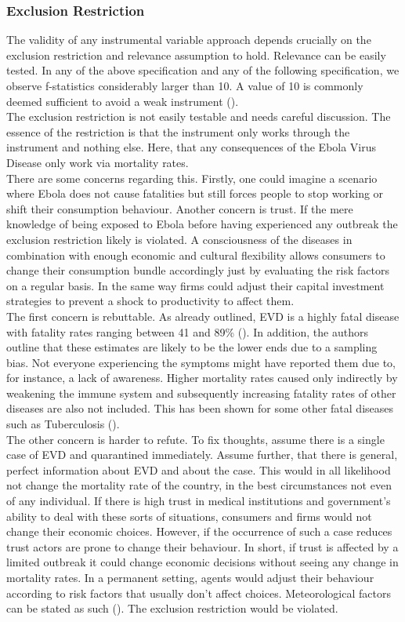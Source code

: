 \documentclass{article}
\begin{document}
\subsubsection{Exclusion Restriction}
The validity of any instrumental variable approach depends crucially on the exclusion restriction and relevance assumption to hold. Relevance can be easily tested. In any of the above specification and any of the following specification, we observe f-statistics considerably larger than 10. A value of 10 is commonly deemed sufficient to avoid a weak instrument (\cite{stock2002testing}). \\
The exclusion restriction is not easily testable and needs careful discussion. The essence of the restriction is that the instrument only works through the instrument and nothing else. Here, that any consequences of the Ebola Virus Disease only work via mortality rates.\\
There are some concerns regarding this. Firstly, one could imagine a scenario where Ebola does not cause fatalities but still forces people to stop working or shift their consumption behaviour. Another concern is trust. If the mere knowledge of being exposed to Ebola before having experienced any outbreak the exclusion restriction likely is violated. A consciousness of the diseases in combination with enough economic and cultural flexibility allows consumers to change their consumption bundle accordingly just by evaluating the risk factors on a regular basis. In the same way firms could adjust their capital investment strategies to prevent a shock to productivity to affect them.\\
The first concern is rebuttable. As already outlined, EVD is a highly fatal disease with fatality rates ranging between 41 and 89\% (\cite{chowell2014transmission}). In addition, the authors outline that these estimates are likely to be the lower ends due to a sampling bias. Not everyone experiencing the symptoms might have reported them due to, for instance, a lack of awareness. Higher mortality rates caused only indirectly by weakening the immune system and subsequently increasing fatality rates of other diseases are also not included. This has been shown for some other fatal diseases such as Tuberculosis (\cite{parpia2016effects}).\\
The other concern is harder to refute. To fix thoughts, assume there is a single case of EVD and quarantined immediately. Assume further, that there is general, perfect information about EVD and about the case. This would in all likelihood not change the mortality rate of the country, in the best circumstances not even of any individual. If there is high trust in medical institutions and government's ability to deal with these sorts of situations, consumers and firms would not change their economic choices. However, if the occurrence of such a case reduces trust actors are prone to change their behaviour. In short, if trust is affected by a limited outbreak it could change economic decisions without seeing any change in mortality rates. In a permanent setting, agents would adjust their behaviour according to risk factors that usually don't affect choices. Meteorological factors can be stated as such (\cite{alexander2015factors}). The exclusion restriction would be violated. \\
\end{document}
